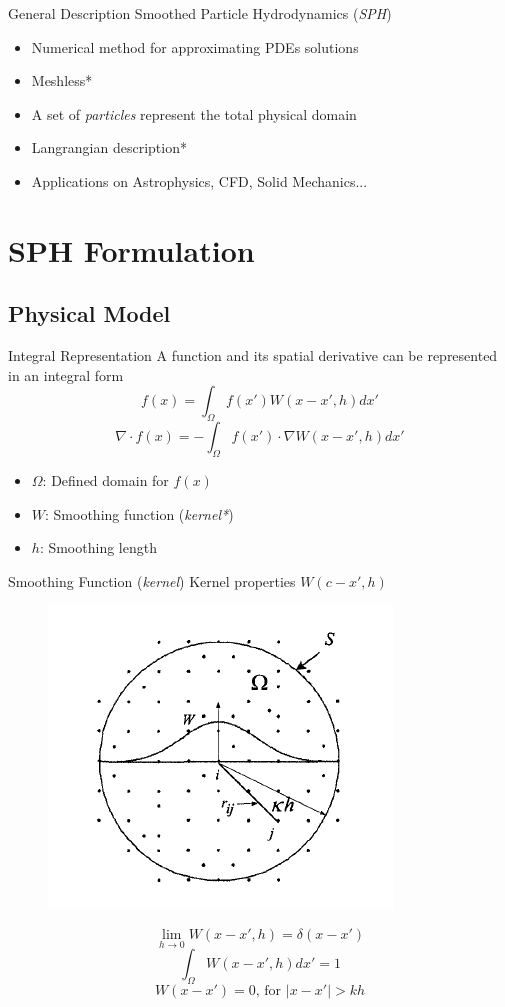 \documentclass[10pt]{beamer}
\begin{document}
\begin{frame}{General Description}
Smoothed Particle Hydrodynamics (\textit{SPH})
\begin{itemize}
\item Numerical method for approximating PDEs solutions
\item Meshless*
\item A set of \textit{particles} represent the total physical domain
\item Langrangian description*
\item Applications on Astrophysics, CFD, Solid Mechanics...
\end{itemize}
\end{frame}


\section{SPH Formulation}

\subsection{Physical Model}

\begin{frame}{Integral Representation}
A function and its spatial derivative can be represented in an integral form
$$f(x)=\int_{\Omega}{f(x')W(x-x',h)dx'}$$
$$\nabla\cdot f(x)=-\int_{\Omega}{f(x')\cdot\nabla W(x-x',h)dx'}$$
\begin{itemize}
\item $\Omega$: Defined domain for $f(x)$
\item $W$: Smoothing function (\textit{kernel*})
\item $h$: Smoothing length
\end{itemize}
\end{frame}


\begin{frame}{Smoothing Function (\textit{kernel})}
Kernel properties $W(c-x',h)$
\begin{figure}[h!]
\includegraphics[scale=.5]{./images/ParticleApprox.PNG}
\end{figure}
$$\lim_{h\to0}{W(x-x',h)}=\delta(x-x')$$
$$\int_{\Omega}W(x-x',h)dx'=1$$
$$W(x-x')=0\text{, for }|x-x'|>kh$$
\end{frame}
\end{document}
